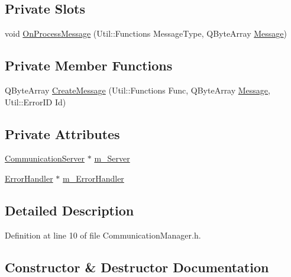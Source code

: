 \subsection*{Private Slots}
\begin{DoxyCompactItemize}
\item 
void \hyperlink{class_r_w_1_1_c_o_r_e_1_1_communication_manager_a3f3cff8fe51bc3eeb7d93d22e5061c06}{On\+Process\+Message} (Util\+::\+Functions Message\+Type, Q\+Byte\+Array \hyperlink{namespace_r_w_1_1_c_o_r_e_a571834b44d0e3fab58aa6abfe5a02988}{Message})
\end{DoxyCompactItemize}
\subsection*{Private Member Functions}
\begin{DoxyCompactItemize}
\item 
Q\+Byte\+Array \hyperlink{class_r_w_1_1_c_o_r_e_1_1_communication_manager_a496af2c201ed48e14033b640cf78ed3f}{Create\+Message} (Util\+::\+Functions Func, Q\+Byte\+Array \hyperlink{namespace_r_w_1_1_c_o_r_e_a571834b44d0e3fab58aa6abfe5a02988}{Message}, Util\+::\+Error\+ID Id)
\end{DoxyCompactItemize}
\subsection*{Private Attributes}
\begin{DoxyCompactItemize}
\item 
\hyperlink{class_r_w_1_1_c_o_r_e_1_1_communication_server}{Communication\+Server} $\ast$ \hyperlink{class_r_w_1_1_c_o_r_e_1_1_communication_manager_ae16c353628da4af164f91c9dd38cefac}{m\+\_\+\+Server}
\item 
\hyperlink{class_r_w_1_1_c_o_r_e_1_1_error_handler}{Error\+Handler} $\ast$ \hyperlink{class_r_w_1_1_c_o_r_e_1_1_communication_manager_ab4035d32b76f3856ba059bed7261ae85}{m\+\_\+\+Error\+Handler}
\end{DoxyCompactItemize}


\subsection{Detailed Description}


Definition at line 10 of file Communication\+Manager.\+h.



\subsection{Constructor \& Destructor Documentation}
\hypertarget{class_r_w_1_1_c_o_r_e_1_1_communication_manager_a8afb1aacf5b5d582256afdda0d191d91}{}\label{class_r_w_1_1_c_o_r_e_1_1_communication_manager_a8afb1aacf5b5d582256afdda0d191d91} 
